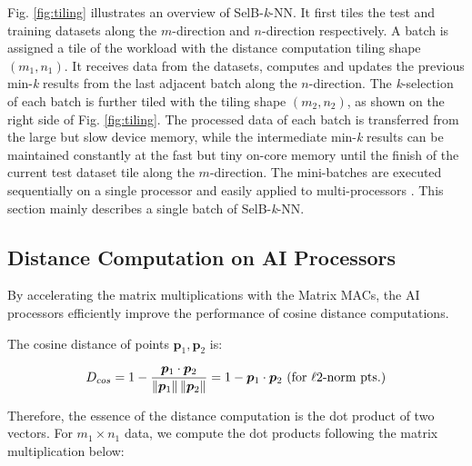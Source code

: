 \documentclass[12pt]{extbook}
\begin{document}
Fig. \ref{fig:tiling} illustrates an overview of SelB-\textit{k}-NN. It first tiles the test and training datasets along the $m$-direction and $n$-direction respectively. A batch is assigned a tile of the workload with the distance computation tiling shape $(m_1, n_1)$. It receives data from the datasets, computes and updates the previous min-\textit{k} results from the last adjacent batch along the $n$-direction. The \textit{k}-selection of each batch is further tiled with the tiling shape $(m_2, n_2)$, as shown on the right side of Fig. \ref{fig:tiling}. The processed data of each batch is transferred from the large but slow device memory, while the intermediate min-\textit{k} results can be maintained constantly at the fast but tiny on-core memory until the finish of the current test dataset tile along the $m$-direction. The mini-batches are executed sequentially on a single processor and easily applied to multi-processors \cite{van2007superlinear}. This section mainly describes a single batch of SelB-\textit{k}-NN.

\subsection{Distance Computation on AI Processors}

By accelerating the matrix multiplications with the Matrix MACs, the AI processors efficiently improve the performance of cosine distance computations. 

The cosine distance of points $\boldsymbol{p}_{1}, \boldsymbol{p}_{2}$ is:

\begin{equation}
    \label{eq:cosine}
    \begin{aligned}
    D_{cos} = 1 - \frac{\boldsymbol{p}_{1} \cdot \boldsymbol{p}_{2}}
            {\left\| \boldsymbol{p}_{1} \right\| 
                \left\| \boldsymbol{p}_{2} \right\|}
        = 1 - \boldsymbol{p}_{1} \cdot \boldsymbol{p}_{2}\  (\textnormal{for } \ell\textnormal{2-norm pts.})
    \end{aligned}
    \end{equation}

Therefore, the essence of the distance computation is the dot product of two vectors. For $m_1 \times n_1$ data, we compute the dot products following the matrix multiplication below:
\end{document}
